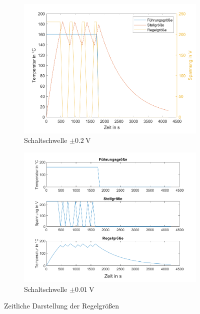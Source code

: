 \documentclass[
    paper=a4,
    fontsize=10pt,
    DIV=13,
    oneside,
]{scrartcl}
\begin{document}
    \begin{figure}
        \centering
        \begin{subfigure}{0.49\columnwidth}
            \includegraphics[width=1.0\columnwidth]{../versuch1/tempregler_plot.png}
            \caption{Schaltschwelle \(\pm\SI{0.2}{\volt}\)}
            \label{fig:tempregler_plot}   
        \end{subfigure}%
        \hfill%
        \begin{subfigure}{0.49\columnwidth}
            \includegraphics[width=1.0\columnwidth]{../versuch1/tempregler_plot_new.png}
            \caption{Schaltschwelle \(\pm\SI{0.01}{\volt}\)}
            \label{fig:tempregler_plot_new}
        \end{subfigure}
        \caption{Zeitliche Darstellung der Regelgrößen}
    \end{figure}
\end{document}
